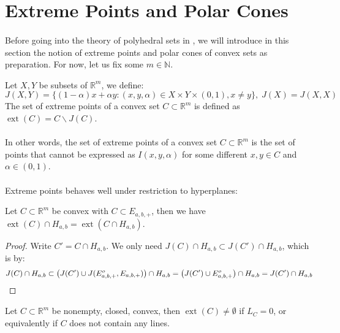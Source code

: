 \section{Extreme Points and Polar Cones}
\label{sect:016}
\paragraph{}Before going into the theory of polyhedral sets in , we will introduce in this section the notion of extreme points and polar cones of convex sets as preparation. For now, let us fix some $m\in \mathbb{N}$.

\begin{defn}\label{defn:016-exterior}
	Let $X,Y$ be subsets of $\mathbb{R}^m$, we define:
	\[
		J(X,Y)=\{(1-\alpha)x+\alpha y:(x,y,\alpha)\in X\times Y\times (0,1),x\neq y\},\;J(X)=J(X,X)
	\]
	The set of extreme points of a convex set $C\subset \mathbb{R}^m$ is defined as $\operatorname{ext}(C)=C\smallsetminus J(C)$.
\end{defn}
\paragraph{}In other words, the set of extreme points of a convex set $C\subset \mathbb{R}^m$ is the set of points that cannot be expressed as $I(x,y,\alpha )$ for some different $x,y\in C$ and $\alpha \in (0,1)$.

\paragraph{}Extreme points behaves well under restriction to hyperplanes:

\begin{lemm}\label{lemm:016-extreme-and-hyperlane}
	Let $C\subset \mathbb{R}^m$ be convex with $C\subset E_{a,b,+}$, then we have $\operatorname{ext}(C)\cap H_{a,b}=\operatorname{ext}(C\cap H_{a,b})$.
\end{lemm}

\begin{proof}
	Write $C'=C\cap H_{a,b}$. We only need $J(C)\cap H_{a,b}\subset J(C')\cap H_{a,b}$, which is by:
	\[
		J(C)\cap H_{a,b}\subset \left(J(C')\cup J(E^{o}_{a,b,+},E_{a,b,+})\right)\cap H_{a,b}=\left(J(C')\cup E^o_{a,b,+}\right)\cap H_{a,b}=J(C')\cap H_{a,b}\qedhere
	\]
\end{proof}

\begin{lemm}\label{lemm:016-extreme-existence}
	Let $C\subset \mathbb{R}^m$ be nonempty, closed, convex, then $\operatorname{ext}(C)\neq\emptyset$ if $L_C=0$, or equivalently if $C$ does not contain any lines.
\end{lemm}

